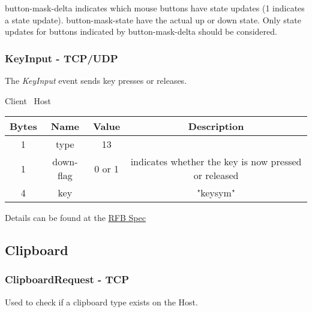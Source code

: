 button-mask-delta indicates which mouse buttons have state updates (1 indicates a state update). button-mask-state have the actual up or down state. Only state updates for buttons indicated by button-mask-delta should be considered.

\subsubsection{KeyInput - TCP/UDP}

The \emph{KeyInput} event sends key presses or releases.

\begin{center}
    Client \textrightarrow\ Host\\
    \begin{tabular}{|c|c|c|c|}
        \hline
        \textbf{Bytes} & \textbf{Name} & \textbf{Value} & \textbf{Description}                                 \\
        \hline
        1              & type          & 13              &                                                      \\
        \hline
        1              & down-flag     & 0 or 1         & indicates whether the key is now pressed or released \\
        \hline
        4              & key           &                & "keysym"                                             \\
        \hline
    \end{tabular}
\end{center}

Details can be found at the \href{https://github.com/rfbproto/rfbproto/blob/master/rfbproto.rst#keyevent}{RFB Spec}

\subsection{Clipboard}

\subsubsection{ClipboardRequest - TCP}

Used to check if a clipboard type exists on the Host.

